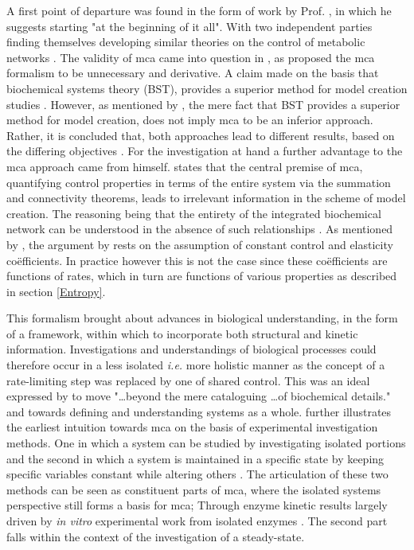 A first point of departure was found in the form of work by Prof. \citeauthor{Hofmeyr2001}, in which he suggests starting "at the beginning of it all". With two independent parties finding themselves developing similar theories on the control of metabolic networks \citep{Rapoport1974, Kacser1973,Hofmeyr2001}. The validity of \gls{mca} came into question in \citeyear{Savageau1987}, as \citeauthor{Savageau1987} proposed the \gls{mca} formalism to be unnecessary and derivative. A claim made on the basis that biochemical systems theory (BST), provides a superior method for model creation studies \cite{Savageau1987, Savageau1987a}. However, as mentioned by \citeauthor{Cornish-Bowden1989}, the mere fact that BST provides a superior method for model creation, does not imply \gls{mca} to be an inferior approach. Rather, it is concluded that, both approaches lead to different results, based on the differing objectives \cite{Cornish-Bowden1989}. For the investigation at hand a further advantage to the \gls{mca} approach came from \citeauthor{Savageau1987} himself. \citeauthor{Savageau1987b} states that the central premise of \gls{mca}, quantifying control properties in terms of the entire system via the summation and connectivity theorems, leads to irrelevant information in the scheme of model creation. The reasoning being that the entirety of the integrated biochemical network can be understood in the absence of such relationships \cite{Savageau1987b}. As mentioned by \citeauthor{Cornish-Bowden1989}, the argument by \citeauthor{Savageau1987b} rests on the assumption of constant control and elasticity co\"efficients. In practice however this is not the case since these co\"efficients are functions of rates, which in turn are functions of various properties as described in section \ref{Entropy}.

This formalism brought about advances in biological understanding, in the form of a framework, within which to incorporate both structural and kinetic information. Investigations and understandings of biological processes could therefore occur in a less isolated \textit{i.e.} more holistic manner as the concept of a rate-limiting step was replaced by one of shared control. This was an ideal expressed by \citeauthor{Kacser1968} to move "\ldots beyond the mere cataloguing \ldots of biochemical details." and towards defining and understanding systems as a whole. \citeauthor{Kacser1968} further illustrates the earliest intuition towards \gls{mca} on the basis of experimental investigation methods. One in which a system can be studied by investigating isolated portions and the second in which a system is maintained in a specific state by keeping specific variables constant while altering others \citep{Kacser1968}. The articulation of these two methods can be seen as constituent parts of \gls{mca}, where the isolated systems perspective still forms a basis for \gls{mca}; Through enzyme kinetic results largely driven by \textit{in vitro} experimental work from isolated enzymes \citep{Hynne2001, Boren2002}. The second part falls within the context of the investigation of a \gls{steady-state}. 

